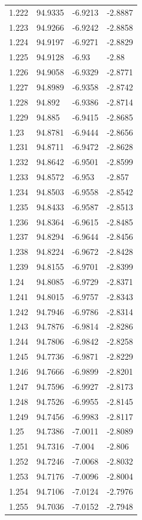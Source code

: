 \begin{tabular}{llll}
1.222 & 94.9335 & -6.9213 & -2.8887 \\
1.223 & 94.9266 & -6.9242 & -2.8858 \\
1.224 & 94.9197 & -6.9271 & -2.8829 \\
1.225 & 94.9128 & -6.93 & -2.88 \\
1.226 & 94.9058 & -6.9329 & -2.8771 \\
1.227 & 94.8989 & -6.9358 & -2.8742 \\
1.228 & 94.892 & -6.9386 & -2.8714 \\
1.229 & 94.885 & -6.9415 & -2.8685 \\
1.23 & 94.8781 & -6.9444 & -2.8656 \\
1.231 & 94.8711 & -6.9472 & -2.8628 \\
1.232 & 94.8642 & -6.9501 & -2.8599 \\
1.233 & 94.8572 & -6.953 & -2.857 \\
1.234 & 94.8503 & -6.9558 & -2.8542 \\
1.235 & 94.8433 & -6.9587 & -2.8513 \\
1.236 & 94.8364 & -6.9615 & -2.8485 \\
1.237 & 94.8294 & -6.9644 & -2.8456 \\
1.238 & 94.8224 & -6.9672 & -2.8428 \\
1.239 & 94.8155 & -6.9701 & -2.8399 \\
1.24 & 94.8085 & -6.9729 & -2.8371 \\
1.241 & 94.8015 & -6.9757 & -2.8343 \\
1.242 & 94.7946 & -6.9786 & -2.8314 \\
1.243 & 94.7876 & -6.9814 & -2.8286 \\
1.244 & 94.7806 & -6.9842 & -2.8258 \\
1.245 & 94.7736 & -6.9871 & -2.8229 \\
1.246 & 94.7666 & -6.9899 & -2.8201 \\
1.247 & 94.7596 & -6.9927 & -2.8173 \\
1.248 & 94.7526 & -6.9955 & -2.8145 \\
1.249 & 94.7456 & -6.9983 & -2.8117 \\
1.25 & 94.7386 & -7.0011 & -2.8089 \\
1.251 & 94.7316 & -7.004 & -2.806 \\
1.252 & 94.7246 & -7.0068 & -2.8032 \\
1.253 & 94.7176 & -7.0096 & -2.8004 \\
1.254 & 94.7106 & -7.0124 & -2.7976 \\
1.255 & 94.7036 & -7.0152 & -2.7948 \\

\end{tabular}
